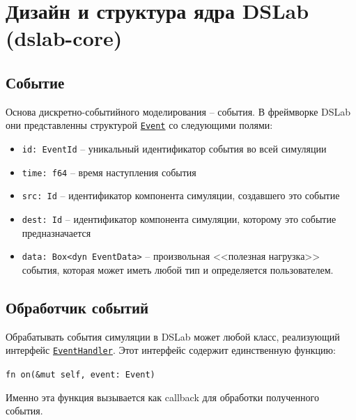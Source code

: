 \section{Дизайн и структура ядра DSLab (dslab-core)} \label{dslab-core-design}

\subsection{Событие} \label{Event}
Основа дискретно-событийного моделирования -- события. В фреймворке DSLab они представленны структурой \underline{\texttt{Event}} со следующими полями: 
\begin{itemize}
    \item \texttt{id: EventId} -- уникальный идентификатор события во всей симуляции
    \item \texttt{time: f64} -- время наступления события 
    \item \texttt{src: Id} -- идентификатор компонента симуляции, создавшего это событие 
    \item \texttt{dest: Id} -- идентификатор компонента симуляции, которому это событие предназначается
    \item \label{Event:payload} \texttt{data: Box<dyn EventData>} -- произвольная <<полезная нагрузка>> события, которая может иметь любой тип и определяется пользователем. 
\end{itemize}

\subsection{Обработчик событий} \label{EventHandler}

Обрабатывать события симуляции в DSLab может любой класс, реализующий интерфейс \underline{\texttt{EventHandler}}. Этот интерфейс содержит единственную функцию: 
\begin{center}
\texttt{fn on(\&mut self, event: Event)}
\label{fnon}
\end{center}

Именно эта функция вызывается как callback для обработки полученного события.

